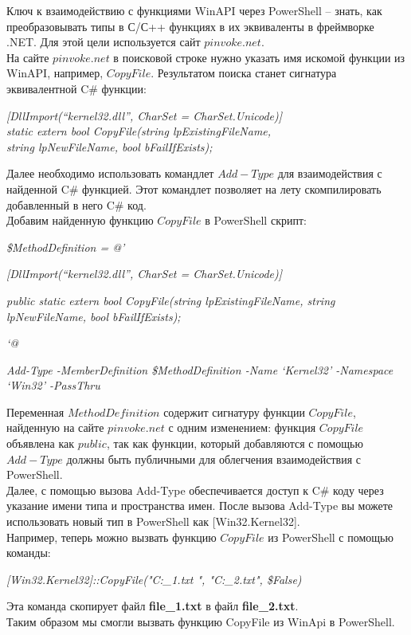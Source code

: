 \documentclass[12pt, a4paper, twoside]{article}
\begin{document}
Ключ к взаимодействию с функциями WinAPI через PowerShell – знать, как преобразовывать типы в С/С++ функциях в их эквиваленты в фреймворке .NET. Для этой цели используется сайт \( pinvoke.net.\) \\

На сайте \( pinvoke.net \) в поисковой строке нужно указать имя искомой функции из WinAPI, например, \( CopyFile \). Результатом поиска станет сигнатура эквивалентной C\# функции:\\

\begin{center}
\textit{[DllImport(“kernel32.dll”, CharSet = CharSet.Unicode)] \\
static extern bool CopyFile(string lpExistingFileName, \\
string lpNewFileName, bool bFailIfExists); }
\end{center}

Далее необходимо использовать командлет \(Add-Type\) для взаимодействия с найденной C\# функцией. Этот командлет позволяет на лету скомпилировать добавленный в него C\# код.\\
\newpage
Добавим найденную функцию \(CopyFile\) в PowerShell скрипт:\\

\begin{center}
\textit{\$MethodDefinition = @’}


\textit{[DllImport(“kernel32.dll”, CharSet = CharSet.Unicode)]}


\textit{public static extern bool CopyFile(string lpExistingFileName, string lpNewFileName, bool bFailIfExists);}


\textit{‘@}


\textit{Add-Type -MemberDefinition \$MethodDefinition -Name ‘Kernel32’ -Namespace ‘Win32’ -PassThru}\\
\end{center}


Переменная \(MethodDefinition\) содержит сигнатуру функции \(CopyFile\), найденную на сайте \(pinvoke.net\) с одним изменением: функция \(CopyFile\) объявлена как \(public\), так как функции, который добавляются с помощью \(Add-Type\) должны быть публичными для облегчения взаимодействия с PowerShell.\\

Далее, с помощью вызова Add-Type обеспечивается доступ к C\# коду через указание имени типа и пространства имен. После вызова Add-Type вы можете использовать новый тип в PowerShell как [Win32.Kernel32].\\


Например, теперь можно вызвать функцию \(CopyFile\) из PowerShell с помощью команды:
\begin{center}
\textit{[Win32.Kernel32]::CopyFile("C:\Documents\file\_1.txt ", "C:\Documents\file\_2.txt", \$False)\\}
\end{center}
Эта команда скопирует файл \textbf{file\_1.txt} в файл \textbf{file\_2.txt}.\\


Таким образом мы смогли вызвать функцию CopyFile из WinApi в PowerShell.
\end{document}
